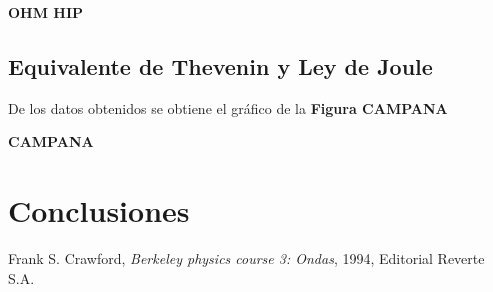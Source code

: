 \documentclass[11pt,a4paper]{article}
\begin{document}
\textbf{OHM HIP}


\subsection{Equivalente de Thevenin y Ley de Joule}

De los datos obtenidos se obtiene el gráfico de la \textbf{Figura CAMPANA}

\textbf{CAMPANA}


\section{Conclusiones}
\label{sec:conclusiones}








\begin{thebibliography}{1}
  Frank S. Crawford, \textit{Berkeley physics course 3: Ondas}, 1994, Editorial Reverte S.A.
\end{thebibliography}
 
\end{document}
